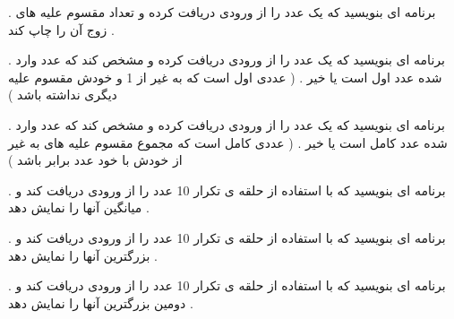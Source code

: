 \documentclass[12pt]{article}
\begin{document}
 . برنامه ای بنویسید که یک عدد را از ورودی دریافت کرده و تعداد مقسوم علیه های زوج آن را چاپ کند .
















 . برنامه ای بنویسید که یک عدد را از ورودی دریافت کرده و مشخص کند که عدد وارد شده عدد اول است یا خیر . ( عددی اول است که به غیر از 1 و خودش مقسوم علیه دیگری نداشته باشد ) 



















 . برنامه ای بنویسید که یک عدد را از ورودی دریافت کرده و مشخص کند که عدد وارد شده عدد کامل است یا خیر . ( عددی کامل است که مجموع مقسوم علیه های به غیر از خودش با خود عدد برابر باشد )













 . برنامه ای بنویسید که با استفاده از حلقه ی تکرار 10 عدد را از ورودی دریافت کند و میانگین آنها را نمایش دهد .













 . برنامه ای بنویسید که با استفاده از حلقه ی تکرار 10 عدد را از ورودی دریافت کند و بزرگترین آنها را نمایش دهد .














 . برنامه ای بنویسید که با استفاده از حلقه ی تکرار 10 عدد را از ورودی دریافت کند و دومین بزرگترین آنها را نمایش دهد .
\end{document}
